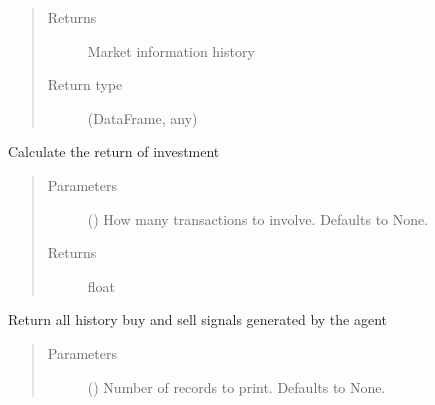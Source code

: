 \documentclass[letterpaper,10pt,english]{sphinxmanual}
\begin{document}
\begin{fulllineitems}
\begin{fulllineitems}
\begin{quote}
\begin{description}
\item[{Returns}] \leavevmode
\sphinxAtStartPar
Market information history

\item[{Return type}] \leavevmode
\sphinxAtStartPar
(DataFrame, any)

\end{description}\end{quote}

\end{fulllineitems}


\begin{fulllineitems}
\label{\detokenize{Recorder:crypto_env.recorder.Recorder.get_roi}}
\sphinxAtStartPar
Calculate the return of investment
\begin{quote}\begin{description}
\item[{Parameters}] \leavevmode
\sphinxAtStartPar
{} (\sphinxstyleliteralemphasis{\sphinxupquote{, }}) \textendash{} How many transactions to involve. Defaults to None.

\item[{Returns}] \leavevmode
\sphinxAtStartPar
float

\end{description}\end{quote}

\end{fulllineitems}


\begin{fulllineitems}
\label{\detokenize{Recorder:crypto_env.recorder.Recorder.get_transaction_record}}
\sphinxAtStartPar
Return all history buy and sell signals generated by the agent
\begin{quote}\begin{description}
\item[{Parameters}] \leavevmode
\sphinxAtStartPar
{} (\sphinxstyleliteralemphasis{\sphinxupquote{, }}) \textendash{} Number of records to print. Defaults to None.


\end{description}
\end{quote}
\end{fulllineitems}
\end{fulllineitems}
\end{document}
